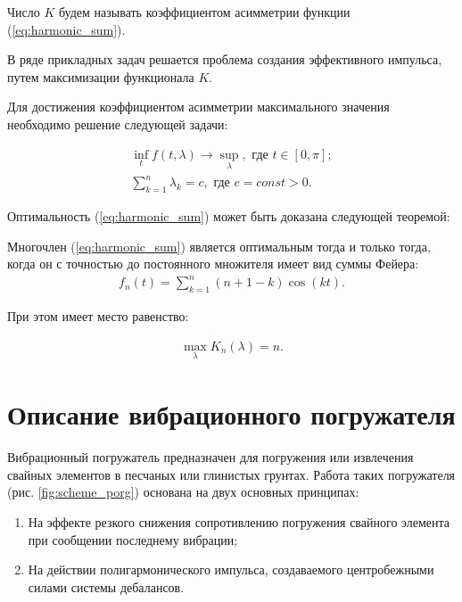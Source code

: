 Число $K$ будем называть коэффициентом асимметрии функции (\ref{eq:harmonic_sum}).

В ряде прикладных задач решается проблема создания эффективного импульса, путем максимизации функционала $K$.

Для достижения коэффициентом асимметрии максимального значения необходимо решение следующей задачи:

\begin{equation}\label{eq:math_task}
    \begin{gathered}
        \inf_t f(t, \lambda) \rightarrow \sup_\lambda, \textrm{ где } t \in [0, \pi];\\
        \sum\limits_{k = 1}^n \lambda_k = c, \textrm{ где } c = const > 0.
    \end{gathered}
\end{equation}

Оптимальность (\ref{eq:harmonic_sum}) может быть доказана следующей теоремой:

\begin{theorem}\cite{impulse_sapronov}\label{th:mf}
    Многочлен (\ref{eq:harmonic_sum}) является оптимальным тогда и только
    тогда, когда он с точностью до постоянного множителя имеет вид суммы Фейера:
    \begin{equation}\label{eq:feer}
        \begin{gathered}
            f_n(t) = \sum\limits_{k = 1}^n (n + 1 - k) \cos(kt).
        \end{gathered}
    \end{equation}
    
    При этом имеет место равенство:
    
    \begin{equation}\label{eq:max_lambda}
        \begin{gathered}
            \max \limits_{\lambda} K_n(\lambda) = n.
        \end{gathered}
    \end{equation}
\end{theorem}

\clearpage
\section{Описание вибрационного погружателя}
\label{chapter:pogr}

Вибрационный погружатель предназначен для погружения или извлечения свайных элементов в песчаных или глинистых грунтах.
Работа таких погружателя (рис. \ref{fig:scheme_porg}) основана на двух основных принципах:
\begin{enumerate} 
    \item На эффекте резкого снижения сопротивлению погружения свайного элемента при сообщении последнему вибрации;
    \item На действии полигармонического импульса, создаваемого центробежными силами системы дебалансов.
\end{enumerate}

